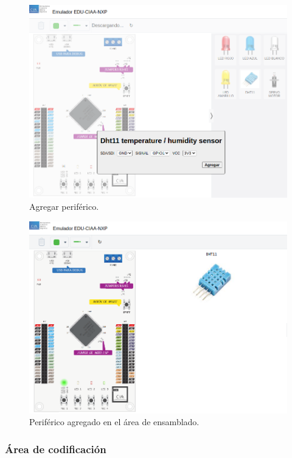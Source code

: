 \begin{figure}[ht]
	\centering
	\includegraphics[scale=.45]{./Figures/AgregarPeriferico.png}
	\caption{Agregar periférico.}
	\label{fig:AgregarPeriferico}
\end{figure}


\begin{figure}[ht]
	\centering
	\includegraphics[scale=.45]{./Figures/AgregarPeriferico2.png}
	\caption{Periférico agregado en el área de ensamblado. }
	\label{fig:AgregarPeriferico2}
\end{figure}


\subsubsection{Área de codificación}

